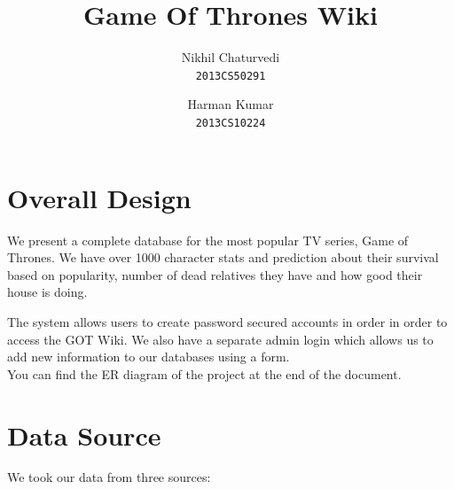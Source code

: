 \documentclass[]{article}
\begin{document}
\author{
  Nikhil Chaturvedi\\
  \texttt{2013CS50291}
  \and
  Harman Kumar\\
  \texttt{2013CS10224}
}

\title{Game Of Thrones Wiki}
\maketitle



\section{Overall Design}

\begin{flushleft}

We present a complete database for the most popular TV series, Game of Thrones. We have over 1000 character stats and prediction about their survival based on popularity, number of dead relatives they have and how good their house is doing.

The system allows users to create password secured accounts in order in order to access the GOT Wiki. We also have a separate admin login which allows us to add new information to our databases using a form.\\

You can find the ER diagram of the project at the end of the document.

\end{flushleft} 

\vspace{25px}

\section{Data Source}

We took our data from three sources:
\end{document}
